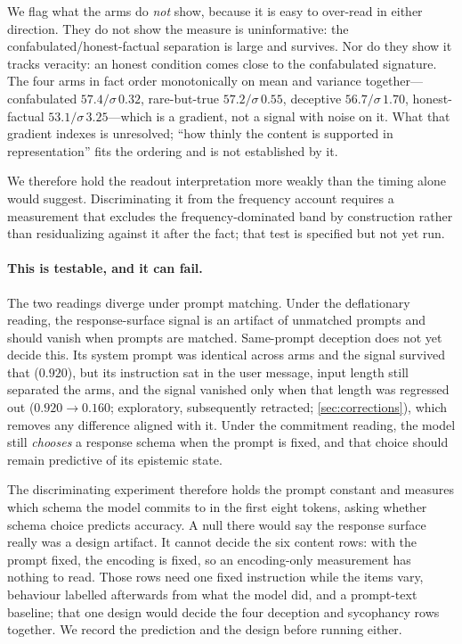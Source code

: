 \documentclass[11pt,a4paper]{article}
\begin{document}
We flag what the arms do \emph{not} show, because it is easy to over-read
in either direction. They do not show the measure is uninformative: the
confabulated/honest-factual separation is large and survives. Nor do they
show it tracks veracity: an honest condition comes close to the confabulated
signature. The four arms in fact order monotonically on mean and variance
together---confabulated $57.4/\sigma\,0.32$, rare-but-true
$57.2/\sigma\,0.55$, deceptive $56.7/\sigma\,1.70$, honest-factual
$53.1/\sigma\,3.25$---which is a gradient, not a signal with noise on it.
What that gradient indexes is unresolved; ``how thinly the content is
supported in representation'' fits the ordering and is not established by
it.

We therefore hold the readout interpretation more weakly than the timing
alone would suggest. Discriminating it from the frequency account requires a
measurement that excludes the frequency-dominated band by construction
rather than residualizing against it after the fact; that test is specified
but not yet run.

\paragraph{This is testable, and it can fail.}
The two readings diverge under prompt matching. Under the deflationary
reading, the response-surface signal is an artifact of unmatched
prompts and should vanish when prompts are matched. Same-prompt
deception does not yet decide this. Its system prompt was identical
across arms and the signal survived that ($0.920$), but its instruction
sat in the user message, input length still separated the arms, and
the signal vanished only when that length was regressed out
($0.920 \to 0.160$; exploratory, subsequently retracted;
\cref{sec:corrections}), which
removes any difference aligned with it.
Under the commitment reading, the model still \emph{chooses} a response
schema when the prompt is fixed, and that choice should remain
predictive of its epistemic state.

The discriminating experiment therefore holds the prompt constant and
measures which schema the model commits to in the first eight tokens,
asking whether schema choice predicts accuracy. A null there would say
the response surface really was a design artifact. It cannot decide
the six content rows: with the prompt fixed, the encoding is fixed, so
an encoding-only measurement has nothing to read. Those rows need one
fixed instruction while the items vary, behaviour labelled afterwards
from what the model did, and a prompt-text baseline; that one design
would decide the four deception and sycophancy rows together. We
record the prediction and the design before running either.
\end{document}
